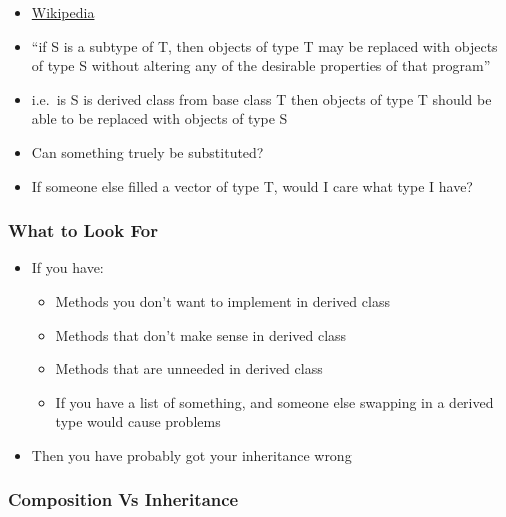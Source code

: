 \begin{itemize}
\tightlist
\item
  \href{https://en.wikipedia.org/wiki/Liskov_substitution_principle}{Wikipedia}
\item
  ``if S is a subtype of T, then objects of type T may be replaced with
  objects of type S without altering any of the desirable properties of
  that program''
\item
  i.e.~is S is derived class from base class T then objects of type T
  should be able to be replaced with objects of type S
\item
  Can something truely be substituted?
\item
  If someone else filled a vector of type T, would I care what type I
  have?
\end{itemize}

\hypertarget{what-to-look-for}{%
\subsubsection{What to Look For}\label{what-to-look-for}}

\begin{itemize}
\tightlist
\item
  If you have:

  \begin{itemize}
  \tightlist
  \item
    Methods you don't want to implement in derived class
  \item
    Methods that don't make sense in derived class
  \item
    Methods that are unneeded in derived class
  \item
    If you have a list of something, and someone else swapping in a
    derived type would cause problems
  \end{itemize}
\item
  Then you have probably got your inheritance wrong
\end{itemize}

\hypertarget{composition-vs-inheritance}{%
\subsubsection{Composition Vs
Inheritance}\label{composition-vs-inheritance}}

